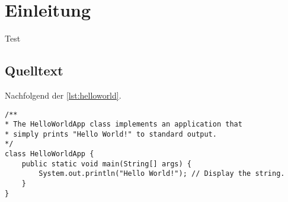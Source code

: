 \chapter{Einleitung}
Test\cite{Khan:2016aa}
\section{Quelltext}

Nachfolgend der \autoref{lst:helloworld}.

\begin{lstlisting}[caption={Hello World}, captionpos=b, label={lst:helloworld}]
/**
* The HelloWorldApp class implements an application that
* simply prints "Hello World!" to standard output.
*/
class HelloWorldApp {
	public static void main(String[] args) {
		System.out.println("Hello World!"); // Display the string.
	}
}
\end{lstlisting}
\blindtext
